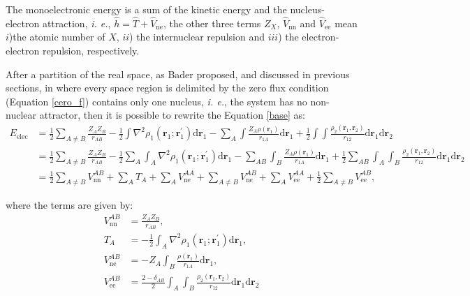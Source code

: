 The monoelectronic energy is a sum of the
kinetic energy and the nucleus-electron attraction, \textit{i. e.}, $\widehat{h}
= \widehat{T} + \widehat{V}_{\mathrm{ne}}$, the other three terms $Z_X$,
$\widehat{V}_{\mathrm{nn}}$ and $\widehat{V}_{\mathrm{ee}}$ mean $i$)the
atomic number of $X$, $ii$) the internuclear repulsion and $iii$) the electron-electron
repulsion, respectively.

After a partition of the real space, as Bader proposed, and
discussed in previous sections, in where every space region is delimited
by the zero flux condition (Equation \ref{cero_f}) contains only one
nucleus, \textit{i. e.}, the system has no non-nuclear attractor, then it
is possible to rewrite the Equation \ref{base} as:
%
\footnotesize
\begin{align} 
E_{\mathrm{elec}}  &=  \frac{1}{2} \sum_{A \neq B} \frac{Z_A Z_B}{r_{AB}} 
-\frac{1}{2} \int \nabla^2 \rho_1(\mathbf{r}_1;
\mathbf{r}_1^{\prime}) \mathrm{d} \mathbf{r}_1
-\sum_A  \int \frac{Z_A \rho(\mathbf{r}_1)}{r_{1A}} \mathrm{d} \mathbf{r}_1 
+\frac{1}{2} \int \int \frac{\rho_2(\mathbf{r}_1,
\mathbf{r}_2)}{r_{12}} \mathrm{d} \mathbf{r}_1
\mathrm{d} \mathbf{r}_2 \nonumber \\
&=  \frac{1}{2} \sum_{A \neq B} \frac{Z_A Z_B}{r_{AB}} 
-\frac{1}{2} \sum_A  \int_A   \nabla^2 \rho_1(\mathbf{r}_1;
\mathbf{r}_1^{\prime}) \mathrm{d} \mathbf{r}_1  
-\sum_{AB} \int_B \frac{Z_A \rho(\mathbf{r}_1)}{r_{1A}} \mathrm{d} \mathbf{r}_1
+\frac{1}{2} \sum_{AB} \int_A \int_B \frac{\rho_2(\mathbf{r}_1,
\mathbf{r}_2)}{r_{12}} \mathrm{d} \mathbf{r}_1 \mathrm{d} \mathbf{r}_2 \nonumber \\
&=  \frac{1}{2} \sum_{A \neq B} V_{\mathrm{nn}}^{AB}
+\sum_A T_A + \sum_A V_{\mathrm{ne}}^{AA}
+\sum_{A \neq B} V_{\mathrm{ne}}^{AB} + \sum_A V_{\mathrm{ee}}^{AA} 
+\frac{1}{2} \sum_{A \neq B} V_{\mathrm{ee}}^{AB},
\end{align}
\normalsize

\noindent where the terms are given by:
%
\begin{align}
V_{\mathrm{nn}}^{AB} &=  \frac{Z_A Z_B}{r_{AB}}, \label{VnnAB} \\
T_A         &= -\frac{1}{2} \int_A \nabla^2 \rho_1 (\mathbf{r}_1;\mathbf{r}_1^{\prime})
\mathrm{d} \mathbf{r}_1, \label{cineticaMono} \\
V_{\mathrm{ne}}^{AB} &= - Z_A \int_B \frac{\rho(\mathbf{r}_1)}{r_{1A}} \mathrm{d}
	\mathbf{r}_1, \label{nucleoElecMono} \\
V_{\mathrm{ee}}^{AB} &= \frac{2 - \delta_{AB}}{2} \int_A \int_B
	\frac{\rho_2(\mathbf{r}_1,\mathbf{r}_2)}{r_{12}} \mathrm{d} \mathbf{r}_1
	\mathrm{d} \mathbf{r}_2 \label{elecElec2Atoms}
\end{align}


